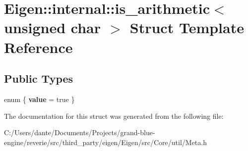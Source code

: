 \hypertarget{struct_eigen_1_1internal_1_1is__arithmetic_3_01unsigned_01char_01_4}{}\section{Eigen\+::internal\+::is\+\_\+arithmetic$<$ unsigned char $>$ Struct Template Reference}
\label{struct_eigen_1_1internal_1_1is__arithmetic_3_01unsigned_01char_01_4}
\subsection*{Public Types}
\begin{DoxyCompactItemize}
\item 
\mbox{\label{struct_eigen_1_1internal_1_1is__arithmetic_3_01unsigned_01char_01_4_ad267bd8a43993c6b168d9dd546b120c6}} 
enum \{ {\bfseries value} = true
 \}
\end{DoxyCompactItemize}


The documentation for this struct was generated from the following file\+:\begin{DoxyCompactItemize}
\item 
C\+:/\+Users/dante/\+Documents/\+Projects/grand-\/blue-\/engine/reverie/src/third\+\_\+party/eigen/\+Eigen/src/\+Core/util/Meta.\+h\end{DoxyCompactItemize}

